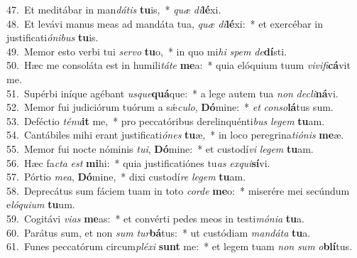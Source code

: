 {47.~}Et meditábar in man\textit{dá}\textit{tis} \textbf{tu}is,~* \textit{quæ} \textit{di}\textbf{lé}xi.\\
{48.~}Et levávi manus meas ad mandáta tua, \textit{quæ} \textit{di}\textbf{lé}xi:~* et exercébar in justificati\textit{ó}\textit{ni}\textit{bus} \textbf{tu}is.\\
{49.~}Memor esto verbi tui \textit{ser}\textit{vo} \textbf{tu}o,~* in quo mi\textit{hi} \textit{spem} \textit{de}\textbf{dí}sti.\\
{50.~}Hæc me consoláta est in humili\textit{tá}\textit{te} \textbf{me}a:~* quia elóquium tuum \textit{vi}\textit{vi}\textit{fi}\textbf{cá}vit me.\\
{51.~}Supérbi iníque agébant \textit{us}\textit{que}\textbf{quá}que:~* a lege autem tua \textit{non} \textit{de}\textit{cli}\textbf{ná}vi.\\
{52.~}Memor fui judiciórum tuórum a sǽ\textit{cu}\textit{lo}, \textbf{Dó}mine:~* \textit{et} \textit{con}\textit{so}\textbf{lá}tus sum.\\
{53.~}Deféctio \textit{té}\textit{nu}\textbf{it} me,~* pro peccatóribus derelinquénti\textit{bus} \textit{le}\textit{gem} \textbf{tu}am.\\
{54.~}Cantábiles mihi erant justificati\textit{ó}\textit{nes} \textbf{tu}æ,~* in loco peregrina\textit{ti}\textit{ó}\textit{nis} \textbf{me}æ.\\
{55.~}Memor fui nocte nóminis \textit{tu}\textit{i}, \textbf{Dó}mine:~* et custodí\textit{vi} \textit{le}\textit{gem} \textbf{tu}am.\\
{56.~}Hæc fa\textit{cta} \textit{est} \textbf{mi}hi:~* quia justificatiónes tu\textit{as} \textit{ex}\textit{qui}\textbf{sí}vi.\\
{57.~}Pórtio \textit{me}\textit{a}, \textbf{Dó}mine,~* dixi custodí\textit{re} \textit{le}\textit{gem} \textbf{tu}am.\\
{58.~}Deprecátus sum fáciem tuam in toto \textit{cor}\textit{de} \textbf{me}o:~* miserére mei secúndum e\textit{ló}\textit{qui}\textit{um} \textbf{tu}um.\\
{59.~}Cogitávi \textit{vi}\textit{as} \textbf{me}as:~* et convérti pedes meos in testi\textit{mó}\textit{ni}\textit{a} \textbf{tu}a.\\
{60.~}Parátus sum, et non \textit{sum} \textit{tur}\textbf{bá}tus:~* ut custódiam \textit{man}\textit{dá}\textit{ta} \textbf{tu}a.\\
{61.~}Funes peccatórum circum\textit{plé}\textit{xi} \textbf{sunt} me:~* et legem tuam \textit{non} \textit{sum} \textit{o}\textbf{blí}tus.\\
